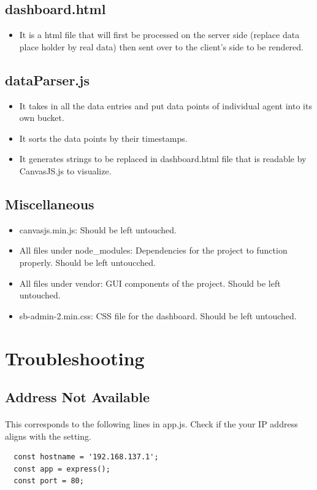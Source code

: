 \documentclass{article}
\begin{document}
\subsection{dashboard.html}
\begin{itemize}
  \item It is a html file that will first be processed on the server side (replace data place holder by real data) then sent over to the client's side to be rendered.
\end{itemize}

\subsection{dataParser.js}
\begin{itemize}
  \item It takes in all the data entries and put data points of individual agent into its own bucket.
  \item It sorts the data points by their timestamps.
  \item It generates strings to be replaced in dashboard.html file that is readable by CanvasJS.js to visualize.
\end{itemize}

\subsection{Miscellaneous}
\begin{itemize}
  \item canvasjs.min.js: Should be left untouched.
  \item All files under node\_modules: Dependencies for the project to function properly. Should be left untoucched.
  \item All files under vendor: GUI components of the project. Should be left untouched.
  \item sb-admin-2.min.css: CSS file for the dashboard. Should be left untouched.
\end{itemize}


\newpage
\section{Troubleshooting}
\subsection{Address Not Available}
\paragraph{} This corresponds to the following lines in app.js. Check if the your IP address aligns with the setting.
\begin{lstlisting}
  const hostname = '192.168.137.1';
  const app = express();
  const port = 80;  
\end{lstlisting}
\end{document}
